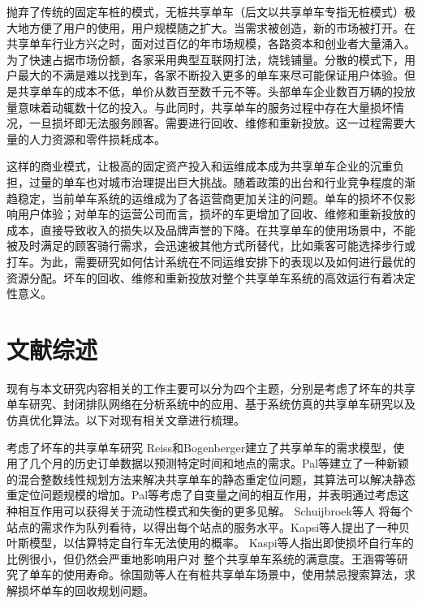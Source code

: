 \documentclass{article}
\begin{document}
抛弃了传统的固定车桩的模式，无桩共享单车（后文以共享单车专指无桩模式）极大地方便了用户的使用，用户规模随之扩大。当需求被创造，新的市场被打开。在共享单车行业方兴之时，面对过百亿的年市场规模，各路资本和创业者大量涌入。为了快速占据市场份额，各家采用典型互联网打法，烧钱铺量。分散的模式下，用户最大的不满是难以找到车，各家不断投入更多的单车来尽可能保证用户体验。但是共享单车的成本不低\cite{王慧君2018共享单车盈利模式分析}，单价从数百至数千元不等。头部单车企业数百万辆的投放量意味着动辄数十亿的投入。与此同时，共享单车的服务过程中存在大量损坏情况，一旦损坏即无法服务顾客。需要进行回收、维修和重新投放。这一过程需要大量的人力资源和零件损耗成本。

这样的商业模式，让极高的固定资产投入和运维成本成为共享单车企业的沉重负担，过量的单车也对城市治理提出巨大挑战。随着政策的出台和行业竞争程度的渐趋稳定，当前单车系统的运维成为了各运营商更加关注的问题。单车的损坏不仅影响用户体验；对单车的运营公司而言，损坏的车更增加了回收、维修和重新投放的成本，直接导致收入的损失以及品牌声誉的下降。在共享单车的使用场景中，不能被及时满足的顾客骑行需求，会迅速被其他方式所替代，比如乘客可能选择步行或打车。为此，需要研究如何估计系统在不同运维安排下的表现以及如何进行最优的资源分配。坏车的回收、维修和重新投放对整个共享单车系统的高效运行有着决定性意义。

\section{文献综述}
现有与本文研究内容相关的工作主要可以分为四个主题，分别是考虑了坏车的共享单车研究、封闭排队网络在分析系统中的应用、基于系统仿真的共享单车研究以及仿真优化算法。以下对现有相关文章进行梳理。

考虑了坏车的共享单车研究\quad
Reiss和Bogenberger\cite{2016Validation}建立了共享单车的需求模型，使用了几个月的历史订单数据以预测特定时间和地点的需求。Pal等\cite{Pal2017Analyzing}建立了一种新颖的混合整数线性规划方法来解决共享单车的静态重定位问题，其算法可以解决静态重定位问题规模的增加。Pal等\cite{Pal2017Free}考虑了自变量之间的相互作用，并表明通过考虑这种相互作用可以获得关于流动性模式和失衡的更多见解。 Schuijbroek等人\cite{Schuijbroek2017Inventory} 将每个站点的需求作为队列看待，以得出每个站点的服务水平。Kapsi等人\cite{KaspiDetection}提出了一种贝叶斯模型，以估算特定自行车无法使用的概率。 Kaspi等人\cite{Kaspi2017Bike}指出即使损坏自行车的比例很小，但仍然会严重地影响用户对 整个共享单车系统的满意度。王涵霄等研究了单车的使用寿命。徐国勋等人\cite{徐国勋2019考虑损坏自行车回收的共享单车调度问题}在有桩共享单车场景中，使用禁忌搜索算法，求解损坏单车的回收规划问题。
\end{document}
